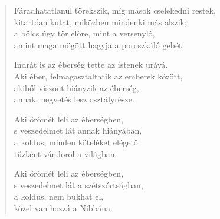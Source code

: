 \begin{verse}
 Fáradhatatlanul törekszik, míg mások cselekedni restek,\\
kitartóan kutat, miközben mindenki más alszik;\\
a bölcs úgy tör előre, mint a versenyló,\\
amint maga mögött hagyja a poroszkáló gebét.

 Indrát is az éberség tette az istenek urává.\\
Aki éber, felmagasztaltatik az emberek között,\\
akiből viszont hiányzik az éberség,\\
annak megvetés lesz osztályrésze.

 Aki örömét leli az éberségben,\\
s veszedelmet lát annak hiányában,\\
a koldus, minden köteléket elégető\\
tűzként vándorol a világban.

 Aki örömét leli az éberségben,\\
s veszedelmet lát a szétszórtságban,\\
a koldus, nem bukhat el,\\
közel van hozzá a Nibbána.

\end{verse}
